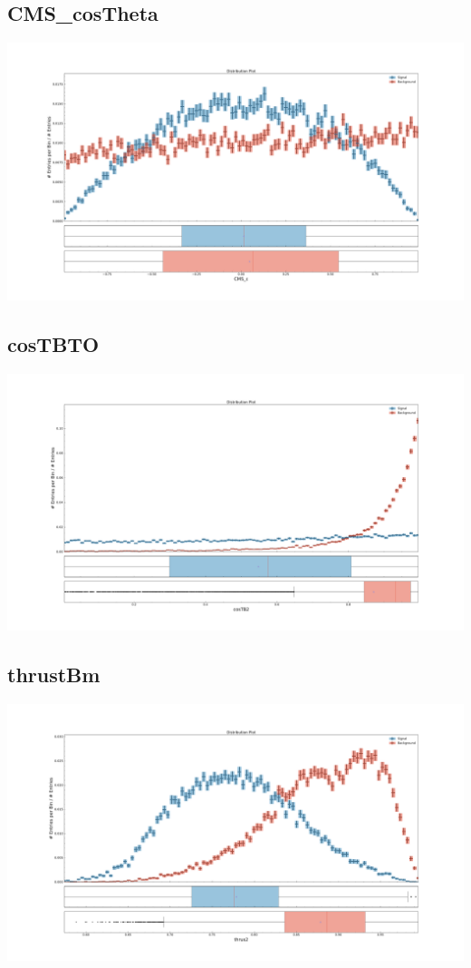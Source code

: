 \documentclass[10pt,a4paper]{article}
\begin{document}
\subsection{CMS\_cosTheta}
\begin{center}
\includegraphics[width=1.0\textwidth]{variable_-985721592984016602.pdf}
\end{center}
\subsection{cosTBTO}
\begin{center}
\includegraphics[width=1.0\textwidth]{variable_-2422279108054391257.pdf}
\end{center}
\subsection{thrustBm}
\begin{center}
\includegraphics[width=1.0\textwidth]{variable_6778051710255325519.pdf}
\end{center}
\end{document}
